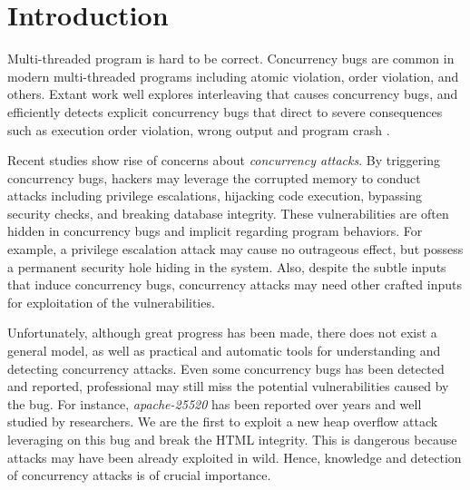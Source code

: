 \section{Introduction} \label{sec:intro}


Multi-threaded program is hard to be correct. 
Concurrency bugs are common in modern multi-threaded programs  
including atomic violation, order violation, and others.
Extant work well explores interleaving that causes concurrency bugs, 
and efficiently detects explicit concurrency bugs that direct to  
severe consequences such as execution order violation, wrong output and program crash
\cite{wu2015:collaborative,tsan,valgrind:pldi,lu:muvi:sosp,conseq:asplos11,conmem:asplos10}.

Recent studies\cite{acidrain:sigmod17,con:hotpar12} show rise of concerns about \emph{concurrency attacks}.
By triggering concurrency bugs, 
hackers may leverage the corrupted memory to conduct  
attacks including privilege escalations\cite{uselib-bug-12791,mysql-bug-14747}, hijacking code execution\cite{msiexploit}, bypassing security checks\cite{cve-2008-0034,cve-2010-0923,cve-2010-1754}, 
and breaking database integrity\cite{acidrain:sigmod17}.
These vulnerabilities are often hidden in concurrency bugs and implicit regarding program behaviors. 
For example, a privilege escalation attack may cause no outrageous effect, 
but possess a permanent security hole hiding in the system.
Also, despite the subtle inputs that induce concurrency bugs, 
concurrency attacks may need other crafted inputs for exploitation of the vulnerabilities. 



Unfortunately, although great progress has been made, there does not exist a general model,
as well as practical and automatic tools for understanding and detecting concurrency attacks. 
Even some concurrency bugs has been detected and reported, 
professional may still miss the potential vulnerabilities caused by the bug. 
For instance, \emph{apache-25520}\cite{apache-bug-25520} has been 
reported over years and well studied by researchers\cite{lu:concurrency-bugs}.  
We are the first to exploit a new heap overflow attack leveraging on this bug and break the HTML integrity. 
This is dangerous because attacks may have been already exploited in wild. 
Hence, knowledge and detection of concurrency attacks is of crucial importance. 

